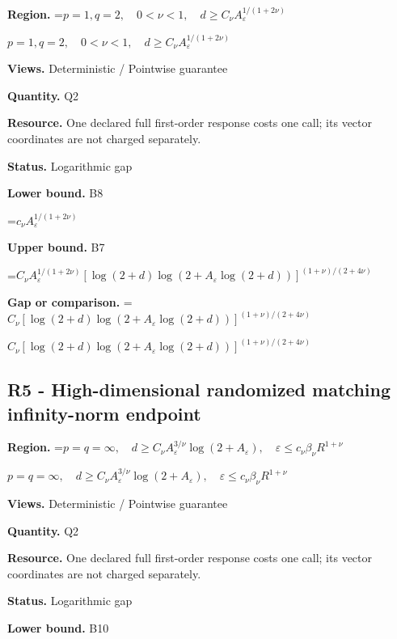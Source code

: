 \documentclass[10pt,a4paper]{article}
\newcommand{\AtlasMath}[1]{\par\begingroup\centering\setbox0=\hbox{$\displaystyle #1$}\ifdim\wd0>1.4\linewidth\typeout{ATLAS WIDE FORMULA: \the\wd0}\fi\ifdim\wd0>\linewidth\resizebox{\linewidth}{!}{\box0}\else\box0\fi\par\endgroup}
\newcommand{\AtlasInlineMath}[1]{\begingroup\setbox0=\hbox{$#1$}\ifdim\wd0>.4\linewidth\endgroup\AtlasMath{#1}\else\endgroup$#1$\fi}
\begin{document}
\textbf{Region.} \AtlasInlineMath{p=1,q=2,\quad0<\nu<1,\quad d\ge C_\nu A_\varepsilon^{1/(1+2\nu)}}



\textbf{Views.} Deterministic / Pointwise guarantee



\textbf{Quantity.} Q2



\textbf{Resource.} One declared full first-order response costs one call; its vector coordinates are not charged separately.



\textbf{Status.} Logarithmic gap



\textbf{Lower bound.} B8



\AtlasMath{c_\nu A_\varepsilon^{1/(1+2\nu)}}


\textbf{Upper bound.} B7



\AtlasMath{C_\nu A_\varepsilon^{1/(1+2\nu)}[\log(2+d)\log(2+A_\varepsilon\log(2+d))]^{(1+\nu)/(2+4\nu)}}


\textbf{Gap or comparison.} \AtlasInlineMath{C_\nu[\log(2+d)\log(2+A_\varepsilon\log(2+d))]^{(1+\nu)/(2+4\nu)}}



\subsection{R5 - High-dimensional randomized matching infinity-norm endpoint}


\textbf{Region.} \AtlasInlineMath{p=q=\infty,\quad d\ge C_\nu A_\varepsilon^{3/\nu}\log(2+A_\varepsilon),\quad\varepsilon\le c_\nu\beta_\nu R^{1+\nu}}



\textbf{Views.} Deterministic / Pointwise guarantee



\textbf{Quantity.} Q2



\textbf{Resource.} One declared full first-order response costs one call; its vector coordinates are not charged separately.



\textbf{Status.} Logarithmic gap



\textbf{Lower bound.} B10
\end{document}
